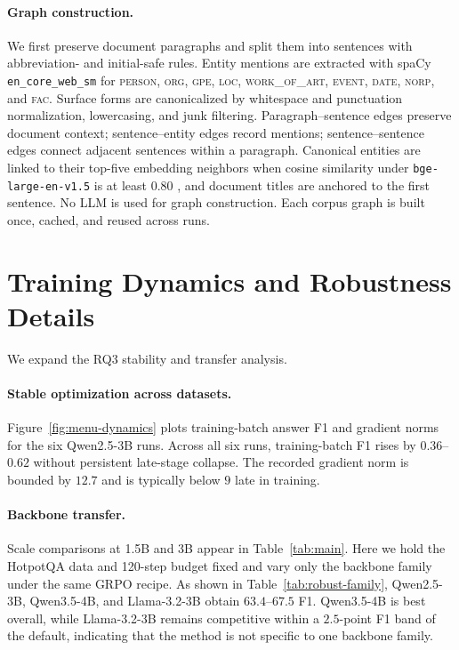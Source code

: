 \documentclass[letterpaper]{article} %
\begin{document}
\paragraph{Graph construction.}
We first preserve document paragraphs and split them into sentences with abbreviation- and initial-safe rules.
Entity mentions are extracted with spaCy \texttt{en\_core\_web\_sm} for \textsc{person}, \textsc{org}, \textsc{gpe}, \textsc{loc}, \textsc{work\_of\_art}, \textsc{event}, \textsc{date}, \textsc{norp}, and \textsc{fac}.
Surface forms are canonicalized by whitespace and punctuation normalization, lowercasing, and junk filtering.
Paragraph--sentence edges preserve document context; sentence--entity edges record mentions; sentence--sentence edges connect adjacent sentences within a paragraph.
Canonical entities are linked to their top-five embedding neighbors when cosine similarity under \texttt{bge-large-en-v1.5} is at least $0.80$ \citep{xiao2023cpack}, and document titles are anchored to the first sentence.
No LLM is used for graph construction.
Each corpus graph is built once, cached, and reused across runs.

\section{Training Dynamics and Robustness Details}
\label{app:robust}

We expand the RQ3 stability and transfer analysis.

\paragraph{Stable optimization across datasets.}
Figure~\ref{fig:menu-dynamics} plots training-batch answer F1 and gradient norms for the six Qwen2.5-3B runs.
Across all six runs, training-batch F1 rises by $0.36$--$0.62$ without persistent late-stage collapse.
The recorded gradient norm is bounded by $12.7$ and is typically below $9$ late in training.

\paragraph{Backbone transfer.}
Scale comparisons at 1.5B and 3B appear in Table~\ref{tab:main}.
Here we hold the HotpotQA data and 120-step budget fixed and vary only the backbone family under the same GRPO recipe.
As shown in Table~\ref{tab:robust-family}, Qwen2.5-3B, Qwen3.5-4B, and Llama-3.2-3B obtain $63.4$--$67.5$ F1.
Qwen3.5-4B is best overall, while Llama-3.2-3B remains competitive within a $2.5$-point F1 band of the default, indicating that the method is not specific to one backbone family.
\end{document}
